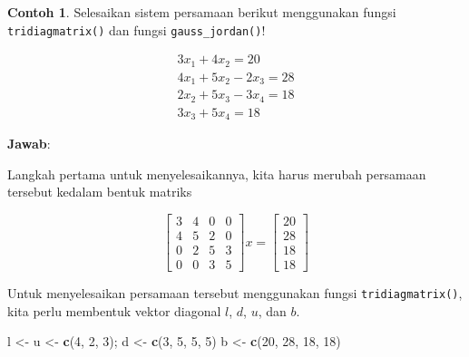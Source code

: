 \documentclass[
]{book}
\newenvironment{Shaded}{\begin{snugshade}}{\end{snugshade}}
\newcommand{\DecValTok}[1]{\textcolor[rgb]{0.00,0.00,0.81}{#1}}
\newcommand{\FunctionTok}[1]{\textcolor[rgb]{0.13,0.29,0.53}{\textbf{#1}}}
\newcommand{\NormalTok}[1]{#1}
\newcommand{\OtherTok}[1]{\textcolor[rgb]{0.56,0.35,0.01}{#1}}
\theoremstyle{definition}
\theoremstyle{definition}
\newtheorem{example}{Contoh}[chapter]
\theoremstyle{definition}
\theoremstyle{definition}
\theoremstyle{remark}
\begin{document}
\begin{example}
\protect\hypertarget{exm:tridiagexm}{}\label{exm:tridiagexm}Selesaikan sistem persamaan berikut menggunakan fungsi \texttt{tridiagmatrix()} dan fungsi \texttt{gauss\_jordan()}!
\end{example}

\[
\begin{matrix}
  3x_1+4x_2=20 \\
  4x_1+5x_2-2x_3=28 \\
  2x_2+5x_3-3x_4=18 \\
  3x_3+5x_4=18
\end{matrix}
\]

\textbf{Jawab}:

Langkah pertama untuk menyelesaikannya, kita harus merubah persamaan tersebut kedalam bentuk matriks

\begin{equation*}
\begin{bmatrix}
     3 & 4 & 0  & 0     \\[0.3em]
     4 & 5 & 2 & 0     \\[0.3em]
     0 & 2 & 5 & 3     \\[0.3em]
     0 & 0 & 3 & 5
\end{bmatrix}
x = \begin{bmatrix}
     20     \\[0.3em]
     28     \\[0.3em]
     18     \\[0.3em]
     18
\end{bmatrix}
\end{equation*}

Untuk menyelesaikan persamaan tersebut menggunakan fungsi \texttt{tridiagmatrix()}, kita perlu membentuk vektor diagonal \(l\), \(d\), \(u\), dan \(b\).

\begin{Shaded}
\begin{Highlighting}[]
\NormalTok{l }\OtherTok{\textless{}{-}}\NormalTok{ u }\OtherTok{\textless{}{-}} \FunctionTok{c}\NormalTok{(}\DecValTok{4}\NormalTok{, }\DecValTok{2}\NormalTok{, }\DecValTok{3}\NormalTok{); d }\OtherTok{\textless{}{-}} \FunctionTok{c}\NormalTok{(}\DecValTok{3}\NormalTok{, }\DecValTok{5}\NormalTok{, }\DecValTok{5}\NormalTok{, }\DecValTok{5}\NormalTok{)}
\NormalTok{b }\OtherTok{\textless{}{-}} \FunctionTok{c}\NormalTok{(}\DecValTok{20}\NormalTok{, }\DecValTok{28}\NormalTok{, }\DecValTok{18}\NormalTok{, }\DecValTok{18}\NormalTok{)}
\end{Highlighting}
\end{Shaded}
\end{document}
